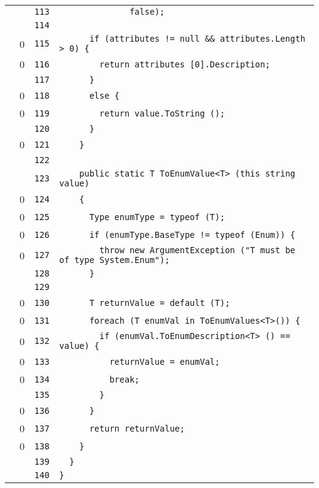 \documentclass[a4paper,10pt]{article}
\begin{document}
\begin{longtable}[l]{lrrl}
\cellcolor{gray} &  & \verb~113~ & \verb~              false);~\\
\cellcolor{gray} &  & \verb~114~ & \verb~~\\
\cellcolor{red} & 0 & \verb~115~ & \verb~      if (attributes != null && attributes.Length > 0) {~\\
\cellcolor{red} & 0 & \verb~116~ & \verb~        return attributes [0].Description;~\\
\cellcolor{gray} &  & \verb~117~ & \verb~      }~\\
\cellcolor{red} & 0 & \verb~118~ & \verb~      else {~\\
\cellcolor{red} & 0 & \verb~119~ & \verb~        return value.ToString ();~\\
\cellcolor{gray} &  & \verb~120~ & \verb~      }~\\
\cellcolor{red} & 0 & \verb~121~ & \verb~    }~\\
\cellcolor{gray} &  & \verb~122~ & \verb~~\\
\cellcolor{gray} &  & \verb~123~ & \verb~    public static T ToEnumValue<T> (this string value)~\\
\cellcolor{red} & 0 & \verb~124~ & \verb~    {~\\
\cellcolor{red} & 0 & \verb~125~ & \verb~      Type enumType = typeof (T);~\\
\cellcolor{red} & 0 & \verb~126~ & \verb~      if (enumType.BaseType != typeof (Enum)) {~\\
\cellcolor{red} & 0 & \verb~127~ & \verb~        throw new ArgumentException ("T must be of type System.Enum");~\\
\cellcolor{gray} &  & \verb~128~ & \verb~      }~\\
\cellcolor{gray} &  & \verb~129~ & \verb~~\\
\cellcolor{red} & 0 & \verb~130~ & \verb~      T returnValue = default (T);~\\
\cellcolor{red} & 0 & \verb~131~ & \verb~      foreach (T enumVal in ToEnumValues<T>()) {~\\
\cellcolor{red} & 0 & \verb~132~ & \verb~        if (enumVal.ToEnumDescription<T> () == value) {~\\
\cellcolor{red} & 0 & \verb~133~ & \verb~          returnValue = enumVal;~\\
\cellcolor{red} & 0 & \verb~134~ & \verb~          break;~\\
\cellcolor{gray} &  & \verb~135~ & \verb~        }~\\
\cellcolor{red} & 0 & \verb~136~ & \verb~      }~\\
\cellcolor{red} & 0 & \verb~137~ & \verb~      return returnValue;~\\
\cellcolor{red} & 0 & \verb~138~ & \verb~    }~\\
\cellcolor{gray} &  & \verb~139~ & \verb~  }~\\
\cellcolor{gray} &  & \verb~140~ & \verb~}~\\
\end{longtable}
\newpage
\end{document}
